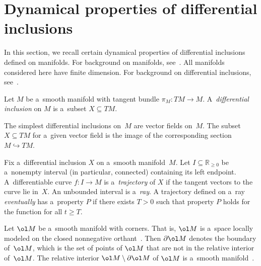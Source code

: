 \section{Dynamical properties of dif\/ferential inclusions}\label{s:dynamical}

In this section, we recall certain dynamical properties of dif\/ferential inclusions def\/ined on ma\-ni\-folds.
For background on manifolds, see~\cite{Lee02smooth}.
All manifolds considered here have f\/inite dimension.
For background on dif\/ferential inclusions, see~\cite{Aubin}.
\begin{Definition}\label{def:diff_incl}
Let $M$ be a~smooth manifold with tangent bundle $\pi_M:TM\to M$.
A~\emph{dif\-fe\-ren\-tial inclusion} on $M$ is a~subset $X\subseteq TM$.
\end{Definition}

\begin{Example}\label{e:vectorfield}
The simplest dif\/ferential inclusions on~$M$ are vector f\/ields on~$M$.
The subset $X\subseteq TM$ for a~given vector f\/ield is the image of the corresponding section $M\hookrightarrow TM$.
\end{Example}

\begin{Definition}\label{def:trajectory}
Fix a~dif\/ferential inclusion $X$ on a~smooth manifold~$M$.
Let $I\subseteq\mathbb{R}_{\geq 0}$ be a~nonempty interval (in particular, connected) containing its left endpoint.
A~dif\/fe\-ren\-tiab\-le curve $f:I\to M$ is a~\emph{trajectory} of $X$ if the tangent vectors to the curve lie in~$X$.
An unbounded interval is a~\emph{ray}.
A trajectory def\/ined on a~ray \emph{eventually} has a~property $P$ if there exists $T>0$ such that property $P$ holds
for the function for all $t\geq T$.
\end{Definition}

Let $\ol M$ be a~smooth manifold with corners.
That is, $\ol M$ is a~space locally modeled on the closed nonnegative orthant~\cite[p.~363]{Lee02smooth}.
Then $\partial\ol M$ denotes the boundary of~$\ol M$, which is the set of points of $\ol M$ that are not in the
relative interior of~$\ol M$.
The relative interior $\ol M\setminus\partial\ol M$ of $\ol M$
is a~smooth manifold~\cite[p.~386, Examples~14--19]{Lee02smooth}.

